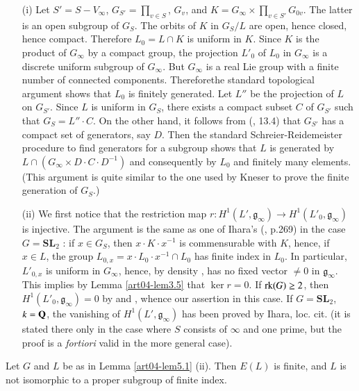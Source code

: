 \begin{itemize}
\item[(i)] Let $S'=S-V_{\infty}$, $G_{S'}=\prod_{v\in S}$, $G_{v}$, and $K=G_{\infty}\times \prod_{v\in S'}G_{0v}$. The latter is an open subgroup of $G_{S}$. The orbits of $K$ in $G_{S}/L$ are open, hence closed, hence compact. Therefore $L_{0}=L\cap K$ is uniform in $K$. Since $K$ is the product of $G_{\infty}$ by a compact group, the projection $L'_{0}$ of $L_{0}$ in $G_{\infty}$ is a discrete uniform subgroup of $G_{\infty}$. But $G_{\infty}$ is a real Lie group with a finite number of connected components. Therefore\pageoriginale the standard topological argument shows that $L_{0}$ is finitely generated. Let $L''$ be the projection of $L$ on $G_{S'}$. Since $L$ is uniform in $G_{S}$, there exists a compact subset $C$ of $G_{S'}$ such that $G_{S}=L''\cdot C.$ On the other hand, it follows from (\cite{art04-key9}, 13.4) that $G_{S'}$ has a compact set of generators, say $D$. Then the standard Schreier-Reidemeister procedure to find generators for a subgroup shows that $L$ is generated by $L\cap (G_{\infty}\times D\cdot C\cdot D^{-1})$ and consequently by $L_{0}$ and finitely many elements. (This argument is quite similar to the one used by Kneser \cite{art04-key17} to prove the finite generation of $G_{S}$.)

\item[(ii)] We first notice that the restriction map $r:H^{1}(L',\mathfrak{g}_{\infty})\to H^{1}(L'_{0},\mathfrak{g}_{\infty})$ is injective. The argument is the same as one of Ihara's (\cite{art04-key14}, p.269) in the case $G=\mathbf{SL}_{2}$ : if $x\in G_{S}$, then $x\cdot K\cdot x^{-1}$ is commensurable with $K$, hence, if $x\in L$, the group $L_{0,x}=x\cdot L_{0}\cdot x^{-1}\cap L_{0}$ has finite index in $L_{0}$. In particular, $L'_{0,x}$ is uniform in $G_{\infty}$, hence, by density \cite{art04-key4}, has no fixed vector $\neq 0$ in $\mathfrak{g}_{\infty}$. This implies by Lemma \ref{art04-lem3.5} that $\ker r=0$. If $\operatorname{\mathrm{rk}}(G)\geq 2$, then $H^{1}(L'_{0},\mathfrak{g}_{\infty})=0$ by \cite{art04-key32} and \cite{art04-key33}, whence our assertion in this case. If $G=\mathbf{SL}_{2}$, $k=\mathbf{Q}$, the vanishing of $H^{1}(L',\mathfrak{g}_{\infty})$ has been proved by Ihara, loc. cit. (it is stated there only in the case where $S$ consists of $\infty$ and one prime, but the proof is a {\em fortiori} valid in the more general case).
\end{itemize}

\begin{theorem}\label{art04-thm5.2}
Let $G$ and $L$ be as in Lemma \ref{art04-lem5.1} (ii). Then $E(L)$ is finite, and $L$ is not isomorphic to a proper subgroup of finite index.
\end{theorem}

